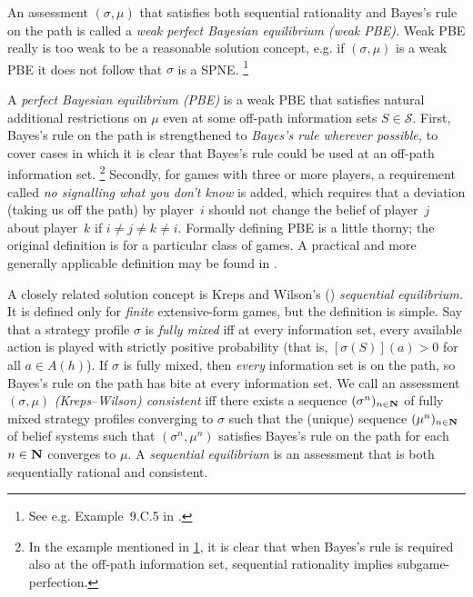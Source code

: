\documentclass[11pt,letterpaper,reqno,oneside]{book}
\begin{document}
An assessment $(\sigma,\mu)$ that satisfies both sequential rationality and Bayes's rule on the path is called a \emph{weak perfect Bayesian equilibrium (weak PBE).} Weak PBE really is too weak to be a reasonable solution concept, e.g. if $(\sigma,\mu)$ is a weak PBE it does not follow that $\sigma$ is a SPNE.%
	\footnote{\label{footnote:wpbe_spne}See e.g. Example~9.C.5 in \textcite[][p.~289]{MascolellWhinstonGreen1995}.}

A \emph{perfect Bayesian equilibrium (PBE)} is a weak PBE that satisfies natural additional restrictions on $\mu$ even at some off-path information sets $S \in \mathcal{S}$. First, Bayes's rule on the path is strengthened to \emph{Bayes's rule wherever possible,} to cover cases in which it is clear that Bayes's rule could be used at an off-path information set.%
	\footnote{In the example mentioned in \cref{footnote:wpbe_spne}, it is clear that when Bayes's rule is required also at the off-path information set, sequential rationality implies subgame-perfection.}
Secondly, for games with three or more players, a requirement called \emph{no signalling what you don't know} is added, which requires that a deviation (taking us off the path) by player~$i$ should not change the belief of player~$j$ about player~$k$ if $i \neq j \neq k \neq i$.
Formally defining PBE is a little thorny; the original definition \parencite{FudenbergTirole1991} is for a particular class of games. A practical and more generally applicable definition may be found in \textcite{Watson2025}.

A closely related solution concept is Kreps and Wilson's (\citeyear{KrepsWilson1982}) \emph{sequential equilibrium.} It is defined only for \emph{finite} extensive-form games, but the definition is simple. Say that a strategy profile $\sigma$ is \emph{fully mixed} iff at every information set, every available action is played with strictly positive probability (that is, $[\sigma(S)](a) > 0$ for all $a \in A(h)$). If $\sigma$ is fully mixed, then \emph{every} information set is on the path, so Bayes's rule on the path has bite at every information set. We call an assessment $(\sigma,\mu)$ \emph{(Kreps--Wilson) consistent} iff there exists a sequence $(\sigma^n)_{n \in \mathbf{N}}$ of fully mixed strategy profiles converging to $\sigma$ such that the (unique) sequence $(\mu^n)_{n \in \mathbf{N}}$ of belief systems such that $(\sigma^n,\mu^n)$ satisfies Bayes's rule on the path for each $n \in \mathbf{N}$ converges to $\mu$. A \emph{sequential equilibrium} is an assessment that is both sequentially rational and consistent.
\end{document}
